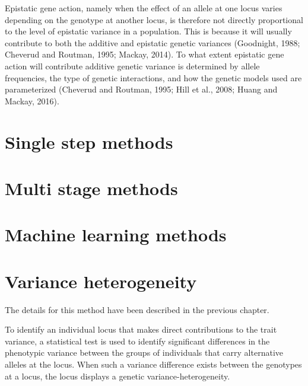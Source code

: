 \documentclass[
]{book}
\begin{document}
Epistatic gene action, namely when the effect of an allele at one locus varies depending on the genotype at another locus, is therefore not directly proportional to the level of epistatic variance in a population. This is because it will usually contribute to both the additive and epistatic genetic variances (Goodnight, 1988; Cheverud and Routman, 1995; Mackay, 2014). To what extent epistatic gene action will contribute additive genetic variance is determined by allele frequencies, the type of genetic interactions, and how the genetic models used are parameterized (Cheverud and Routman, 1995; Hill et al., 2008; Huang and Mackay, 2016).

\hypertarget{single-step-methods-1}{%
\section{Single step methods}\label{single-step-methods-1}}

\hypertarget{multi-stage-methods-1}{%
\section{Multi stage methods}\label{multi-stage-methods-1}}

\hypertarget{machine-learning-methods-1}{%
\section{Machine learning methods}\label{machine-learning-methods-1}}

\hypertarget{variance-heterogeneity-1}{%
\section{Variance heterogeneity}\label{variance-heterogeneity-1}}

The details for this method have been described in the previous chapter.

To identify an individual locus that makes direct contributions to the trait variance, a statistical test is used to identify significant differences in the phenotypic variance between the groups of individuals that carry alternative alleles at the locus. When such a variance difference exists between the genotypes at a locus, the locus displays a genetic variance-heterogeneity.
\end{document}
